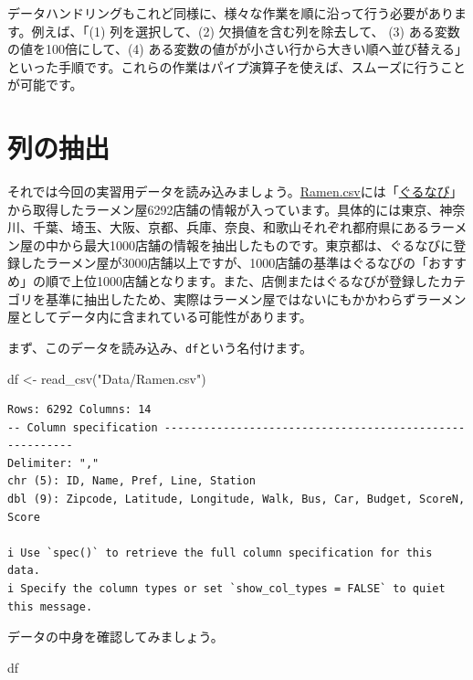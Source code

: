 \documentclass[
  a4paper,
  pandoc,
  ja=standard,
  jafont=haranoaji]{bxjsbook}
\newenvironment{Shaded}{\begin{snugshade}}{\end{snugshade}}
\newcommand{\FunctionTok}[1]{\textcolor[rgb]{0.28,0.35,0.67}{#1}}
\newcommand{\NormalTok}[1]{\textcolor[rgb]{0.00,0.48,0.65}{#1}}
\newcommand{\OtherTok}[1]{\textcolor[rgb]{0.00,0.48,0.65}{#1}}
\newcommand{\StringTok}[1]{\textcolor[rgb]{0.13,0.47,0.30}{#1}}
\begin{document}
データハンドリングもこれど同様に、様々な作業を順に沿って行う必要があります。例えば、「(1)
列を選択して、(2) 欠損値を含む列を除去して、 (3)
ある変数の値を100倍にして、(4)
ある変数の値がが小さい行から大きい順へ並び替える」といった手順です。これらの作業はパイプ演算子を使えば、スムーズに行うことが可能です。

\hypertarget{sec-handling1_select}{%
\section{列の抽出}\label{sec-handling1_select}}

それでは今回の実習用データを読み込みましょう。\href{Data/Ramen.csv}{Ramen.csv}には「\href{https://www.gnavi.co.jp}{ぐるなび}」から取得したラーメン屋6292店舗の情報が入っています。具体的には東京、神奈川、千葉、埼玉、大阪、京都、兵庫、奈良、和歌山それぞれ都府県にあるラーメン屋の中から最大1000店舗の情報を抽出したものです。東京都は、ぐるなびに登録したラーメン屋が3000店舗以上ですが、1000店舗の基準はぐるなびの「おすすめ」の順で上位1000店舗となります。また、店側またはぐるなびが登録したカテゴリを基準に抽出したため、実際はラーメン屋ではないにもかかわらずラーメン屋としてデータ内に含まれている可能性があります。

まず、このデータを読み込み、\texttt{df}という名付けます。

\begin{Shaded}
\begin{Highlighting}[numbers=left,,]
\NormalTok{df }\OtherTok{\textless{}{-}} \FunctionTok{read\_csv}\NormalTok{(}\StringTok{"Data/Ramen.csv"}\NormalTok{)}
\end{Highlighting}
\end{Shaded}

\begin{verbatim}
Rows: 6292 Columns: 14
-- Column specification --------------------------------------------------------
Delimiter: ","
chr (5): ID, Name, Pref, Line, Station
dbl (9): Zipcode, Latitude, Longitude, Walk, Bus, Car, Budget, ScoreN, Score

i Use `spec()` to retrieve the full column specification for this data.
i Specify the column types or set `show_col_types = FALSE` to quiet this message.
\end{verbatim}

データの中身を確認してみましょう。

\begin{Shaded}
\begin{Highlighting}[numbers=left,,]
\NormalTok{df}
\end{Highlighting}
\end{Shaded}
\end{document}
